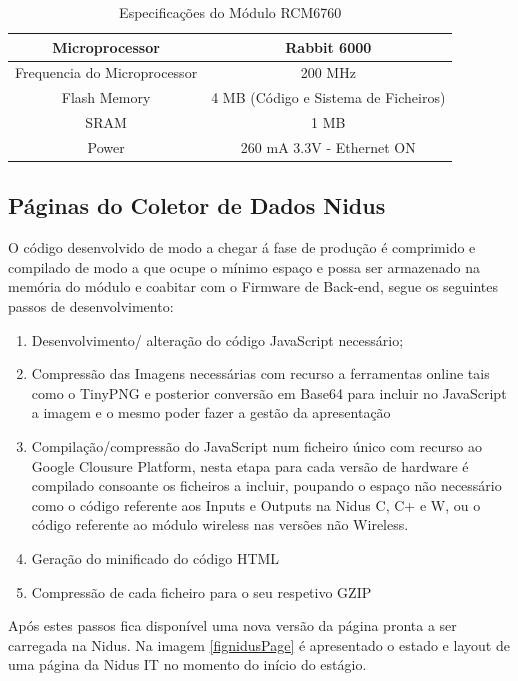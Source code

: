 \begin{table}[htb]
\centering
\caption{Especificações do Módulo RCM6760}\label{tab0}
\begin{tabular}{|c|c|}\hline
Microprocessor&Rabbit 6000 \\\hline
Frequencia do Microprocessor &200 MHz\\\hline
Flash Memory &4 MB (Código e Sistema de Ficheiros)\\\hline
SRAM&1 MB\\\hline
Power &260 mA 3.3V - Ethernet ON\\\hline
\end{tabular} 
\end{table}

\subsection{Páginas do Coletor de Dados Nidus} \label{Página do Coletor de Dados Nidus}
\par
O código desenvolvido de modo a chegar á fase de produção é comprimido e compilado de modo a que ocupe o mínimo espaço e possa ser armazenado na memória do módulo e coabitar com o Firmware de Back-end, segue os seguintes passos de desenvolvimento:
\begin{enumerate}
\item Desenvolvimento/ alteração do código JavaScript necessário; 
\item Compressão das Imagens necessárias com recurso a ferramentas online tais como o TinyPNG\cite{tinypng} e posterior conversão em Base64 para incluir no JavaScript a imagem e o mesmo poder fazer a gestão da apresentação
\item Compilação/compressão do JavaScript num ficheiro único com recurso ao Google Clousure Platform, nesta etapa para cada versão de hardware é compilado consoante os ficheiros a incluir, poupando o espaço não necessário como o código referente aos Inputs e Outputs na Nidus C, C+ e W, ou o código referente ao módulo wireless nas versões não Wireless.
\item Geração do minificado do código HTML
\item Compressão de cada ficheiro para o seu respetivo GZIP
\end{enumerate}
\par
Após estes passos fica disponível uma nova versão da página pronta a ser carregada na Nidus.
Na imagem \ref{fignidusPage} é apresentado o estado e layout de uma página da Nidus IT no momento do início do estágio.

